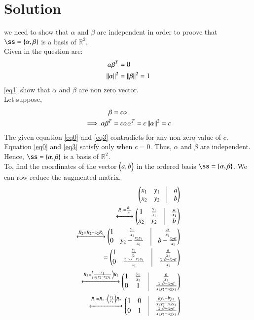 \documentclass[journal,12pt,twocolumn]{IEEEtran}
\begin{document}
\section{Solution}
we need to show that $\alpha$ and $\beta$ are independent in order to proove that $\ss=\{\vec{\alpha},\vec{\beta}\}$ is a basis of $\mathbb{R}^2$.\\
Given in the question are:
\begin{align}
\alpha\beta^T&=0\label{eq0}\\
\left\lVert\alpha\right\rVert^2 &=\left\lVert\beta\right\rVert^2=1 \label{eq1}
\end{align}
\ref{eq1} show that $\alpha$ and $\beta$ are non zero vector.\\
Let suppose,
\begin{align}
\beta&=c\alpha\label{eq2}\\
\implies \alpha\beta^T&=c\alpha\alpha^T=c\left\lVert\alpha\right\rVert^2=c\label{eq3}
\end{align}
The given equation \ref{eq0} and \ref{eq3} contradicts for any non-zero value of $c$. Equation \ref{eq0} and \ref{eq3} satisfy only when $c=0$.
Thus, $\alpha$ and $\beta$ are independent. \\
Hence, $\ss=\{\vec{\alpha},\vec{\beta}\}$ is a basis of $\mathbb{R}^2$.\\
To, find the coordinates of the vector $\begin{pmatrix}a,b\end{pmatrix}$ in the ordered basis $\ss=\{\vec{\alpha},\vec{\beta}\}$. We
can row-reduce the augmented matrix,
   \begin{align}
      \myvec{x_1&y_1&\vrule&a\\x_2&y_2&\vrule&b}\\
        \xleftrightarrow{R_1=\frac{R_1}{x_1}}\myvec{1&\frac{y_1}{x_1}&\vrule&\frac{a}{x_1}\\x_2&y_2&\vrule&b}\\
     \xleftrightarrow{R_2=R_2-x_2R_1}\myvec{1&\frac{y_1}{x_1}&\vrule&\frac{a}{x_1}\\0&y_2-\frac{x_2y_1}{x_1}&\vrule&b-\frac{x_2a}{x_1}}\\
     =\myvec{1&\frac{y_1}{x_1}&\vrule&\frac{a}{x_1}\\0&\frac{x_1y_2-x_2y_1}{x_1}&\vrule&\frac{x_1b-x_2a}{x_1}}\\
      \xleftrightarrow{R_2=\left(\frac{x_1}{x_1y_2-x_2y_1}\right)R_2}\myvec{1&\frac{y_1}{x_1}&\vrule&\frac{a}{x_1}\\0&1&\vrule&\frac{x_1b-x_2a}{x_1y_2-x_2y_1}}\\
      \xleftrightarrow{R_1=R_1-\left(\frac{y_1}{x_1}\right)R_2}\myvec{1&0&\vrule&\frac{ay_2-by_1}{x_1y_2-x_2y_1}\\0&1&\vrule&\frac{x_1b-x_2a}{x_1y_2-x_2y_1}}\label{eq12}
\end{align}
\end{document}
